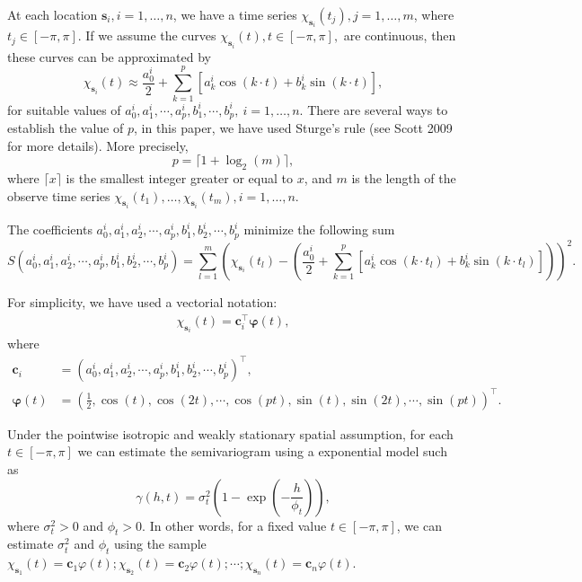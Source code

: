 \documentclass[
  12pt,
]{article}
\theoremstyle{definition}
\theoremstyle{definition}
\theoremstyle{definition}
\theoremstyle{remark}
\begin{document}
At each location \(\bm{s}_i, i=1, \dots, n\), we have a time series \(\chi_{\bm{s}_i}(t_j), j=1, \dots, m\), where \(t_j \in [-\pi, \pi]\).
If we assume the curves \(\chi_{\bm{s}_i}(t), t\in [-\pi, \pi],\) are continuous, then these curves can be approximated by
\begin{equation*}
\chi_{\bm{s}_i}(t) \approx \dfrac{a_0^i}{2} + \sum_{k=1}^{p} \left[ a_k^i \cos(k\cdot t) + b_k^i \sin(k \cdot t) \right],
\end{equation*}
for suitable values of \(a_0^i, a_1^i, \cdots, a_p^i, b_1^i, \cdots, b_p^i, \ i=1, \dots, n\).
There are several ways to establish the value of \(p\), in this paper, we have used Sturge's rule (see Scott 2009 for more details). More precisely,
\begin{equation*}
p= \lceil 1+\log_2(m) \rceil,
\end{equation*}
where \(\lceil x \rceil\) is the smallest integer greater or equal to \(x\), and \(m\) is the length of the observe time series \(\chi_{\bm{s}_i}(t_1), \dots, \chi_{\bm{s}_i}(t_m), i=1, \dots, n\).

The coefficients \(a_0^i, a_1^i, a_2^i, \cdots, a_p^i, b_1^i, b_2^i, \cdots, b_p^i\) minimize the following sum
\begin{equation*}
S(a_0^i, a_1^i, a_2^i, \cdots, a_p^i, b_1^i, b_2^i, \cdots, b_p^i) =  \sum_{l=1}^{m}  \left( \chi_{\bm{s}_i}(t_l) - \left(
\dfrac{a_0^i}{2} + \sum_{k=1}^{p} \left[ a_k^i \cos(k\cdot t_l) + b_k^i \sin(k \cdot t_l) \right] \right) \right)^2 .
\end{equation*}

For simplicity, we have used a vectorial notation:
\begin{align*}
\chi_{\bm{s}_i}(t) =  \bm{c}_i^\top \bm{\varphi}(t),
\end{align*}
where
\begin{align*}
\bm{c}_i &= \left(a_0^i, a_1^i, a_2^i, \cdots, a_p^i, b_1^i, b_2^i, \cdots, b_p^i\right) ^\top,\\
\bm{\varphi}(t) &= \left( \frac{1}{2}, \cos(t), \cos(2t) , \cdots, \cos(pt), \sin(t), \sin(2t) , \cdots, \sin(pt)\right)^\top.
\end{align*}

Under the pointwise isotropic and weakly stationary spatial assumption, for each \(t \in [-\pi, \pi]\) we can estimate the semivariogram using a exponential model such as
\begin{equation*}
\gamma(h, t) = \sigma_t^2 \left(1-\exp\left( -\dfrac{h}{\phi_t} \right)\right),
\end{equation*}
where \(\sigma_t^2 >0\) and \(\phi_t > 0\). In other words, for a fixed value \(t \in [-\pi, \pi]\), we can estimate \(\sigma_t^2\) and \(\phi_t\) using the sample \(\chi_{\bm{s}_1}(t)=\bm{c}_1\varphi(t); \chi_{\bm{s}_2}(t)= \bm{c}_2\varphi(t);\cdots; \chi_{\bm{s}_n}(t)=\bm{c}_n\varphi(t)\).
\end{document}
